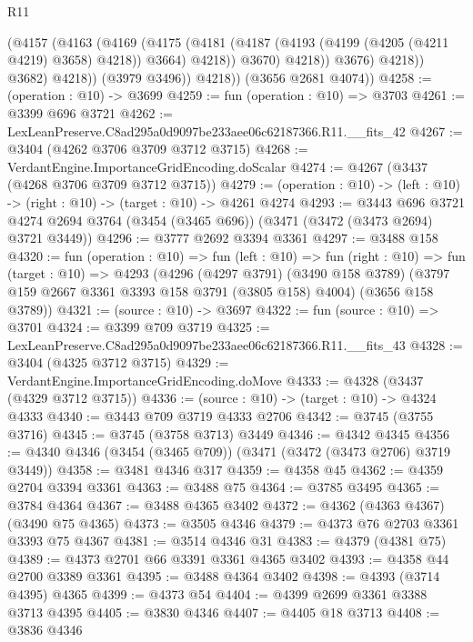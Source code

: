 \begin{lexlean}{R11}
\begin{coremodule}
                        (@4157
                          (@4163
                            (@4169
                              (@4175
                                (@4181
                                  (@4187 (@4193 (@4199 (@4205 (@4211 @4219) @3658) @4218)) @3664)
                                  @4218))
                              @3670)
                            @4218))
                        @3676)
                      @4218))
                  @3682)
                @4218))
            (@3979 @3496))
          @4218))
      (@3656 @2681 @4074))
@4258 := (operation : @10) -> @3699
@4259 := fun (operation : @10) => @3703
@4261 := @3399 @696 @3721
@4262 := LexLeanPreserve.C8ad295a0d9097be233aee06c62187366.R11.__fits_42
@4267 := @3404 (@4262 @3706 @3709 @3712 @3715)
@4268 := VerdantEngine.ImportanceGridEncoding.doScalar
@4274 := @4267 (@3437 (@4268 @3706 @3709 @3712 @3715))
@4279 := (operation : @10) -> (left : @10) -> (right : @10) -> (target : @10) -> @4261 @4274
@4293 := @3443
    @696
    @3721
    @4274
    @2694
    @3764
    (@3454 (@3465 @696))
    (@3471 (@3472 (@3473 @2694) @3721 @3449))
@4296 := @3777 @2692 @3394 @3361
@4297 := @3488 @158
@4320 := fun (operation : @10) =>
  fun (left : @10) =>
  fun (right : @10) =>
  fun (target : @10) =>
  @4293
    (@4296
      (@4297 @3791)
      (@3490 @158 @3789)
      (@3797 @159 @2667 @3361 @3393 @158 @3791 (@3805 @158) @4004)
      (@3656 @158 @3789))
@4321 := (source : @10) -> @3697
@4322 := fun (source : @10) => @3701
@4324 := @3399 @709 @3719
@4325 := LexLeanPreserve.C8ad295a0d9097be233aee06c62187366.R11.__fits_43
@4328 := @3404 (@4325 @3712 @3715)
@4329 := VerdantEngine.ImportanceGridEncoding.doMove
@4333 := @4328 (@3437 (@4329 @3712 @3715))
@4336 := (source : @10) -> (target : @10) -> @4324 @4333
@4340 := @3443 @709 @3719 @4333 @2706
@4342 := @3745 (@3755 @3716)
@4345 := @3745 (@3758 @3713) @3449
@4346 := @4342 @4345
@4356 := @4340 @4346 (@3454 (@3465 @709)) (@3471 (@3472 (@3473 @2706) @3719 @3449))
@4358 := @3481 @4346 @317
@4359 := @4358 @45
@4362 := @4359 @2704 @3394 @3361
@4363 := @3488 @75
@4364 := @3785 @3495
@4365 := @3784 @4364
@4367 := @3488 @4365 @3402
@4372 := @4362 (@4363 @4367) (@3490 @75 @4365)
@4373 := @3505 @4346
@4379 := @4373 @76 @2703 @3361 @3393 @75 @4367
@4381 := @3514 @4346 @31
@4383 := @4379 (@4381 @75)
@4389 := @4373 @2701 @66 @3391 @3361 @4365 @3402
@4393 := @4358 @44 @2700 @3389 @3361
@4395 := @3488 @4364 @3402
@4398 := @4393 (@3714 @4395) @4365
@4399 := @4373 @54
@4404 := @4399 @2699 @3361 @3388 @3713 @4395
@4405 := @3830 @4346
@4407 := @4405 @18 @3713
@4408 := @3836 @4346

\end{coremodule}
\end{lexlean}
